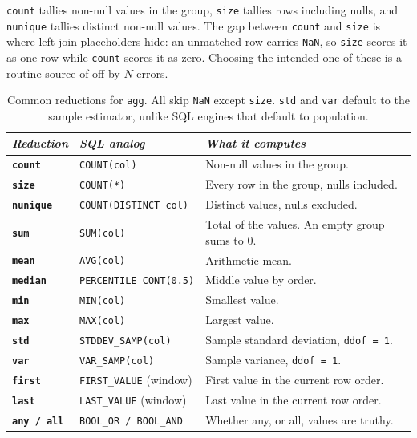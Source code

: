 \vspace{1ex}

\begin{keybox}
\texttt{count} tallies non-null values in the group, \texttt{size} tallies rows including nulls, and \texttt{nunique} tallies distinct non-null values. The gap between \texttt{count} and \texttt{size} is where left-join placeholders hide: an unmatched row carries \texttt{NaN}, so \texttt{size} scores it as one row while \texttt{count} scores it as zero. Choosing the intended one of these is a routine source of off-by-$N$ errors.
\end{keybox}

\vspace{2ex}

\begin{table}[H]
\centering
\footnotesize
\renewcommand{\arraystretch}{1.4}
\begin{tabularx}{\textwidth}{>{\raggedright\arraybackslash}p{} >{\raggedright\arraybackslash}p{} >{\raggedright\arraybackslash}X}
\toprule
\textit{Reduction} & \textit{SQL analog} & \textit{What it computes} \\
\midrule
\textbf{\texttt{count}} & \texttt{COUNT(col)} & Non-null values in the group. \\
\textbf{\texttt{size}} & \texttt{COUNT(*)} & Every row in the group, nulls included. \\
\textbf{\texttt{nunique}} & \texttt{COUNT(DISTINCT col)} & Distinct values, nulls excluded. \\
\textbf{\texttt{sum}} & \texttt{SUM(col)} & Total of the values. An empty group sums to 0. \\
\textbf{\texttt{mean}} & \texttt{AVG(col)} & Arithmetic mean. \\
\textbf{\texttt{median}} & \texttt{PERCENTILE\_CONT(0.5)} & Middle value by order. \\
\textbf{\texttt{min}} & \texttt{MIN(col)} & Smallest value. \\
\textbf{\texttt{max}} & \texttt{MAX(col)} & Largest value. \\
\textbf{\texttt{std}} & \texttt{STDDEV\_SAMP(col)} & Sample standard deviation, \texttt{ddof = 1}. \\
\textbf{\texttt{var}} & \texttt{VAR\_SAMP(col)} & Sample variance, \texttt{ddof = 1}. \\
\textbf{\texttt{first}} & \texttt{FIRST\_VALUE} (window) & First value in the current row order. \\
\textbf{\texttt{last}} & \texttt{LAST\_VALUE} (window) & Last value in the current row order. \\
\textbf{\texttt{any / all}} & \texttt{BOOL\_OR / BOOL\_AND} & Whether any, or all, values are truthy. \\
\bottomrule
\end{tabularx}
\caption*{Common reductions for \texttt{agg}. All skip \texttt{NaN} except \texttt{size}. \texttt{std} and \texttt{var} default to the sample estimator, unlike SQL engines that default to population.}
\end{table}

